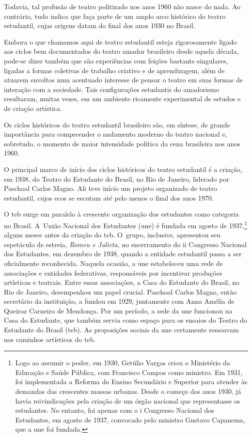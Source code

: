 {Todavia, tal profusão de teatro politizado nos anos 1960 não nasce do
nada. Ao contrário, tudo indica que faça parte de um amplo arco
histórico do teatro estudantil, cujas origens datam do final dos anos
1930 no Brasil.

Embora o que chamamos aqui de teatro estudantil esteja rigorosamente
ligado aos ciclos bem documentados do teatro amador brasileiro desde
aquela década, pode-se dizer também que são experiências com feições
bastante singulares, ligadas a formas coletivas de trabalho criativo e
de aprendizagem, além de atuarem envoltos num acentuado interesse de
pensar o teatro em suas formas de interação com a sociedade. Tais
configurações estudantis do amadorismo resultaram, muitas vezes, em um
ambiente ricamente experimental de estudos e de criação artística.

Os ciclos históricos do teatro estudantil brasileiro são, em síntese,
de grande importância para compreender o andamento moderno do teatro
nacional e, sobretudo, o momento de maior intensidade política da cena
brasileira nos anos 1960.

\subject{Pedra angular: Teatro do Estudante do Brasil}

O principal marco de início dos ciclos históricos do teatro estudantil é
a criação, em 1938, do Teatro do Estudante do Brasil, no Rio de Janeiro,
liderado por Paschoal Carlos Magno. Ali teve início um projeto
organizado de teatro estudantil, cujos ecos se escutam até pelo menos o
final dos anos 1970.

O {\sc teb} surge em paralelo à crescente organização dos estudantes como
categoria no Brasil. A~União Nacional dos Estudantes ({\sc une}) é fundada em
agosto de 1937,\footnote{Logo ao assumir o poder, em 1930, Getúlio Vargas
  criou o Ministério da Educação e Saúde Pública, com Francisco Campos
  como ministro. Em 1931, foi implementada a Reforma do Ensino
  Secundário e Superior para atender às demandas das crescentes massas
  urbanas. Desde o começo dos anos 1930, já havia reivindicações pela
  criação de um órgão nacional que representasse os estudantes. No
  entanto, foi apenas com o {\sc i} Congresso Nacional dos Estudantes, em
  agosto de 1937, convocado pelo ministro Gustavo Capanema, que a {\sc une}
  foi fundada.} alguns meses antes da criação do {\sc teb}. O~grupo,
inclusive, apresentou seu espetáculo de estreia, {\it Romeu e Julieta},
no encerramento do {\sc ii} Congresso Nacional dos Estudantes, em dezembro de
1938, quando a entidade estudantil passa a ser oficialmente reconhecida.
Naquela ocasião, a {\sc une} estabeleceu uma rede de associações e entidades
federativas, responsáveis por incentivar produções artísticas e
teatrais. Entre essas associações, a Casa do Estudante do Brasil, no Rio
de Janeiro, desempenhou um papel crucial. Paschoal Carlos Magno, então
secretário da instituição, a fundou em 1929, juntamente com Anna Amélia
de Queiroz Carneiro de Mendonça. Por um período, a sede da {\sc une} funcionou
na Casa do Estudante, que também servia como espaço para os ensaios do
Teatro do Estudante do Brasil ({\sc teb}). As proposições sociais da {\sc une}
certamente ressoavam nos caminhos artísticos do {\sc teb}.

}
